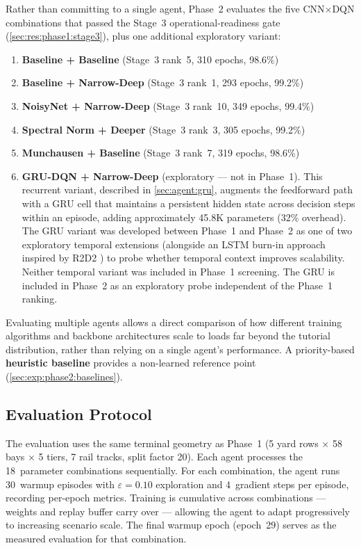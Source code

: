 Rather than committing to a single agent, Phase~2 evaluates the five CNN$\times$DQN combinations that passed the Stage~3 operational-readiness gate (\cref{sec:res:phase1:stage3}), plus one additional exploratory variant:

\begin{enumerate}
  \item \textbf{Baseline + Baseline} (Stage~3 rank~5, 310 epochs, 98.6\%)
  \item \textbf{Baseline + Narrow-Deep} (Stage~3 rank~1, 293 epochs, 99.2\%)
  \item \textbf{NoisyNet + Narrow-Deep} (Stage~3 rank~10, 349 epochs, 99.4\%)
  \item \textbf{Spectral Norm + Deeper} (Stage~3 rank~3, 305 epochs, 99.2\%)
  \item \textbf{Munchausen + Baseline} (Stage~3 rank~7, 319 epochs, 98.6\%)
  \item \textbf{GRU-DQN + Narrow-Deep} (exploratory --- not in Phase~1).  This recurrent variant, described in \cref{sec:agent:gru}, augments the feedforward path with a GRU cell that maintains a persistent hidden state across decision steps within an episode, adding approximately 45.8K parameters (32\% overhead).  The GRU variant was developed between Phase~1 and Phase~2 as one of two exploratory temporal extensions (alongside an LSTM burn-in approach inspired by R2D2 \cite{kapturowski2019r2d2}) to probe whether temporal context improves scalability.  Neither temporal variant was included in Phase~1 screening. The GRU is included in Phase~2 as an exploratory probe independent of the Phase~1 ranking.
\end{enumerate}

Evaluating multiple agents allows a direct comparison of how different training algorithms and backbone architectures scale to loads far beyond the tutorial distribution, rather than relying on a single agent's performance.  A priority-based \textbf{heuristic baseline} provides a non-learned reference point (\cref{sec:exp:phase2:baselines}).

\subsection{Evaluation Protocol}
\label{sec:exp:phase2:config}

The evaluation uses the same terminal geometry as Phase~1 (5 yard rows $\times$ 58 bays $\times$ 5 tiers, 7 rail tracks, split factor 20).  Each agent processes the 18~parameter combinations sequentially.  For each combination, the agent runs 30~warmup episodes with $\varepsilon = 0.10$ exploration and 4~gradient steps per episode, recording per-epoch metrics.  Training is cumulative across combinations --- weights and replay buffer carry over --- allowing the agent to adapt progressively to increasing scenario scale.  The final warmup epoch (epoch~29) serves as the measured evaluation for that combination.


